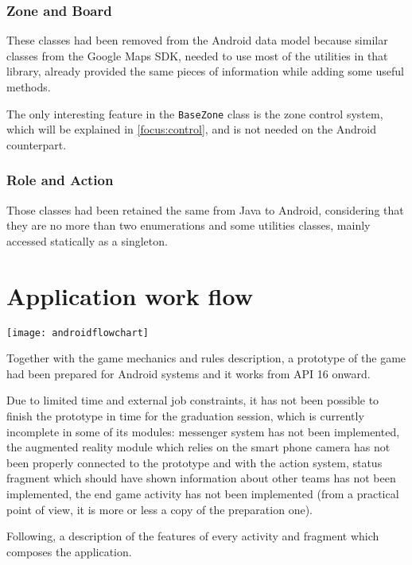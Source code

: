 			\subsubsection{Zone and Board}
			
				These classes had been removed from the Android data model because similar classes from the Google Maps SDK, needed to use most of the utilities in that library, already provided the same pieces of information while adding some useful methods.
				
				The only interesting feature in the \lstinline|BaseZone| class is the zone control system, which will be explained in \autoref{focus:control}, and is not needed on the Android counterpart.
			
			\subsubsection{Role and Action}
			
				Those classes had been retained the same from Java to Android, considering that they are no more than two enumerations and some utilities classes, mainly accessed statically as a singleton.
			
	\section{Application work flow}\label{app:workflow}
	
		\texttt{[image: androidflowchart]}
		
		\newpage
		
		Together with the game mechanics and rules description, a prototype of the game had been prepared for Android systems and it works from API 16 onward.
			
		Due to limited time and external job constraints, it has not been possible to finish the prototype in time for the graduation session, which is currently incomplete in some of its modules: messenger system has not been implemented, the augmented reality module which relies on the smart phone camera has not been properly connected to the prototype and with the action system, status fragment which should have shown information about other teams has not been implemented, the end game activity has not been implemented (from a practical point of view, it is more or less a copy of the preparation one).
		
		Following, a description of the features of every activity and fragment which composes the application.
		
